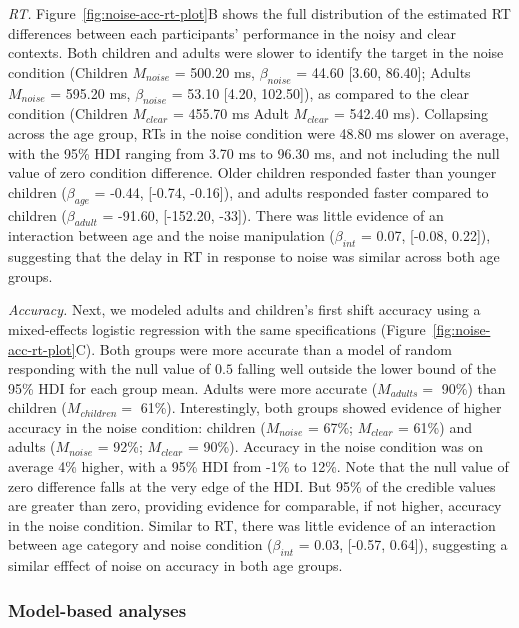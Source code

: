 \documentclass[,man,floatsintext]{apa6}
\begin{document}
\emph{RT.} Figure~\ref{fig:noise-acc-rt-plot}B shows the full distribution of the estimated RT differences between each participants' performance in the noisy and clear contexts. Both children and adults were slower to identify the target in the noise condition (Children \(M_{noise}\) = 500.20 ms, \(\beta_{noise}\) = 44.60 {[}3.60, 86.40{]}; Adults \(M_{noise}\) = 595.20 ms, \(\beta_{noise}\) = 53.10 {[}4.20, 102.50{]}), as compared to the clear condition (Children \(M_{clear}\) = 455.70 ms Adult \(M_{clear}\) = 542.40 ms). Collapsing across the age group, RTs in the noise condition were 48.80 ms slower on average, with the 95\% HDI ranging from 3.70 ms to 96.30 ms, and not including the null value of zero condition difference. Older children responded faster than younger children (\(\beta_{age}\) = -0.44, {[}-0.74, -0.16{]}), and adults responded faster compared to children (\(\beta_{adult}\) = -91.60, {[}-152.20, -33{]}). There was little evidence of an interaction between age and the noise manipulation (\(\beta_{int}\) = 0.07, {[}-0.08, 0.22{]}), suggesting that the delay in RT in response to noise was similar across both age groups.

\emph{Accuracy.} Next, we modeled adults and children's first shift accuracy using a mixed-effects logistic regression with the same specifications (Figure~\ref{fig:noise-acc-rt-plot}C). Both groups were more accurate than a model of random responding with the null value of \(0.5\) falling well outside the lower bound of the 95\% HDI for each group mean. Adults were more accurate (\(M_{adults} =\) 90\%) than children (\(M_{children} =\) 61\%). Interestingly, both groups showed evidence of higher accuracy in the noise condition: children (\(M_{noise}\) = 67\%; \(M_{clear}\) = 61\%) and adults (\(M_{noise}\) = 92\%; \(M_{clear}\) = 90\%). Accuracy in the noise condition was on average 4\% higher, with a 95\% HDI from -1\% to 12\%. Note that the null value of zero difference falls at the very edge of the HDI. But 95\% of the credible values are greater than zero, providing evidence for comparable, if not higher, accuracy in the noise condition. Similar to RT, there was little evidence of an interaction between age category and noise condition (\(\beta_{int}\) = 0.03, {[}-0.57, 0.64{]}), suggesting a similar efffect of noise on accuracy in both age groups.

\hypertarget{model-based-analyses-1}{%
\subsubsection{Model-based analyses}\label{model-based-analyses-1}}
\end{document}
